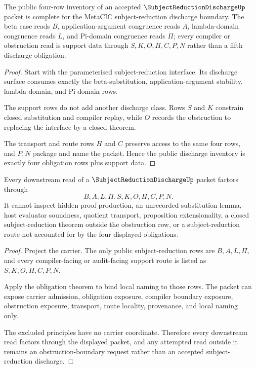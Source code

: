 \begin{theorem}
\label{thm:subject-reduction-discharge-four-row-completeness}
The public four-row inventory of an accepted $\SubjectReductionDischargeUp$ packet is complete for the MetaCIC subject-reduction discharge boundary. The beta case reads $B$, application-argument congruence reads $A$, lambda-domain congruence reads $L$, and Pi-domain congruence reads $\Pi$; every compiler or obstruction read is support data through $S,K,O,H,C,P,N$ rather than a fifth discharge obligation.
\end{theorem}
\begin{proof}
Start with the parameterised subject-reduction interface. Its discharge surface consumes exactly the beta-substitution, application-argument stability, lambda-domain, and Pi-domain rows.

The support rows do not add another discharge class. Rows $S$ and $K$ constrain closed substitution and compiler replay, while $O$ records the obstruction to replacing the interface by a closed theorem.

The transport and route rows $H$ and $C$ preserve access to the same four rows, and $P,N$ package and name the packet. Hence the public discharge inventory is exactly four obligation rows plus support data.
\end{proof}

\begin{theorem}
\label{thm:subject-reduction-discharge-nonescape}
Every downstream read of a $\SubjectReductionDischargeUp$ packet factors through
$$
B,A,L,\Pi,S,K,O,H,C,P,N.
$$
It cannot inspect hidden proof production, an unrecorded substitution lemma, host evaluator soundness, quotient transport, proposition extensionality, a closed subject-reduction theorem outside the obstruction row, or a subject-reduction route not accounted for by the four displayed obligations.
\end{theorem}
\begin{proof}
Project the carrier. The only public subject-reduction rows are $B,A,L,\Pi$, and every compiler-facing or audit-facing support route is listed as $S,K,O,H,C,P,N$.

Apply the obligation theorem to bind local naming to those rows. The packet can expose carrier admission, obligation exposure, compiler boundary exposure, obstruction exposure, transport, route locality, provenance, and local naming only.

The excluded principles have no carrier coordinate. Therefore every downstream read factors through the displayed packet, and any attempted read outside it remains an obstruction-boundary request rather than an accepted subject-reduction discharge.
\end{proof}

